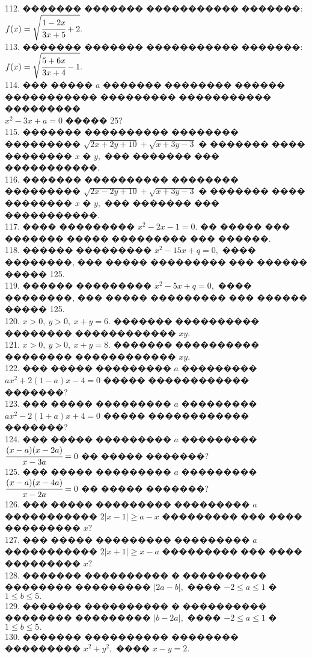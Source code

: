 \documentclass[12pt]{article}
\begin{document}
112. ������� ������� ����������� �������: $f(x)=\sqrt{\cfrac{1-2x}{3x+5}+2}.$\\
113. ������� ������� ����������� �������: $f(x)=\sqrt{\cfrac{5+6x}{3x+4}-1}.$\\
114. ��� ����� $a$ ������� �������� ������ ����������� ��������� ����������� ���������\\ $x^2-3x+a=0$ ����� 25?\\
115. ������� ���������� �������� ��������� $\sqrt{2x+2y+10}+\sqrt{x+3y-3}$ � ������� ���� �������� $x$ � $y,$ ��� ������� ��� �����������.\\
116. ������� ���������� �������� ��������� $\sqrt{2x-2y+10}+\sqrt{x+3y-3}$ � ������� ���� �������� $x$ � $y,$ ��� ������� ��� �����������.\\
117. ���� ��������� $x^2-2x-1=0.$ �� ����� ��� ������� ����� ��������� ��� ������.\\
118. ������ ��������� $x^2-15x+q=0,$ ���� ��������, ��� ����� ��������� ��� ������ ����� 125.\\
119. ������ ��������� $x^2-5x+q=0,$ ���� ��������, ��� ����� ��������� ��� ������ ����� 125.\\
120. $x > 0,\ y > 0,\ x+y=6.$ ������� ���������� �������� ������������ $xy.$\\
121. $x > 0,\ y > 0,\ x+y=8.$ ������� ���������� �������� ������������ $xy.$\\
122. ��� ����� ��������� $a$ ��������� $ax^2+2(1-a)x-4=0$ ����� ������������ �������?\\
123. ��� ����� ��������� $a$ ��������� $ax^2-2(1+a)x+4=0$ ����� ������������ �������?\\
124. ��� ����� ��������� $a$ ��������� $\cfrac{(x-a)(x-2a)}{x-3a}=0$ �� ����� �������?\\
125. ��� ����� ��������� $a$ ��������� $\cfrac{(x-a)(x-4a)}{x-2a}=0$ �� ����� �������?\\
126. ��� ����� ��������� ��������� $a$ ����������� $2|x-1|\geqslant a-x$ ��������� ��� ���� ��������� $x?$\\
127. ��� ����� ��������� ��������� $a$ ����������� $2|x+1|\geqslant x-a$ ��������� ��� ���� ��������� $x?$\\
128. ������� ���������� � ���������� �������� ��������� $|2a-b|,$ ���� $-2\leqslant a \leqslant 1$ � $1\leqslant b \leqslant 5.$\\
129. ������� ���������� � ���������� �������� ��������� $|b-2a|,$ ���� $-2\leqslant a \leqslant 1$ � $1\leqslant b \leqslant 5.$\\
130. ������� ���������� �������� ��������� $x^2+y^2,$ ���� $x-y=2.$\\
\end{document}
